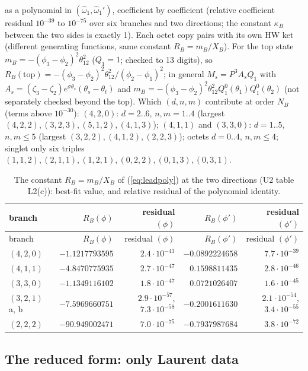 \documentclass[11pt]{article}
\begin{document}
as a polynomial in $(\hat\omega_1,\hat\omega_1')$, coefficient by coefficient (relative coefficient residual $10^{-39}$ to $10^{-75}$ over six branches and two directions; the constant $\kappa_B$ between the two sides is exactly 1).
Each octet copy pairs with its own HW ket (different generating functions, same constant $R_B=m_B/X_B$).
For the top state $m_B=-(\phi_3-\phi_2)^2\theta_{12}^2$ ($Q_1=1$; checked to 13 digits), so $R_B(\mathrm{top})=-(\phi_3-\phi_2)^2\theta_{12}^2/(\phi_2-\phi_1)^2$; in general $M_s=P^3A_sQ_1$ with $A_s=(\zeta_3-\zeta_2)e^{\sigma\theta_s}(\theta_s-\theta_t)$ and $m_B=-(\phi_3-\phi_2)^2\theta_{12}^2Q_1^0(\theta_1)Q_1^0(\theta_2)$ (not separately checked beyond the top).
Which $(d,n,m)$ contribute at order $N_B$ (terms above $10^{-30}$): $(4,2,0)$: $d=2..6$, $n,m=1..4$ (largest $(4,2,2),(3,2,3),(5,1,2),(4,1,3)$); $(4,1,1)$ and $(3,3,0)$: $d=1..5$, $n,m\le5$ (largest $(3,2,2),(4,1,2),(2,2,3)$); octets $d=0..4$, $n,m\le4$; singlet only six triples $(1,1,2),(2,1,1),(1,2,1),(0,2,2),(0,1,3),(0,3,1)$.

{\small
\begin{longtable}{lrrrr}
\caption{The constant $R_B=m_B/X_B$ of (\ref{eq:leadpoly}) at the two directions (U2 table L2(c)): best-fit value, and relative residual of the polynomial identity.}\label{tab:RB}\\
\toprule
branch & $R_B(\phi)$ & residual $(\phi)$ & $R_B(\phi')$ & residual $(\phi')$ \\
\midrule
\endfirsthead
\toprule
branch & $R_B(\phi)$ & residual $(\phi)$ & $R_B(\phi')$ & residual $(\phi')$ \\
\midrule
\endhead
\bottomrule
\endlastfoot
$(4,2,0)$ & $-1.1217793595$ & $2.4\cdot10^{-43}$ & $-0.0892224658$ & $7.7\cdot10^{-39}$ \\
$(4,1,1)$ & $-4.8470775935$ & $2.7\cdot10^{-47}$ & $0.1598811435$ & $2.8\cdot10^{-46}$ \\
$(3,3,0)$ & $-1.1349116102$ & $1.8\cdot10^{-47}$ & $0.0721026407$ & $1.6\cdot10^{-45}$ \\
$(3,2,1)$ a, b & $-7.5969660751$ & $2.9\cdot10^{-57}$, $7.3\cdot10^{-58}$ & $-0.2001611630$ & $2.1\cdot10^{-54}$, $3.4\cdot10^{-55}$ \\
$(2,2,2)$ & $-90.949002471$ & $7.0\cdot10^{-75}$ & $-0.7937987684$ & $3.8\cdot10^{-72}$ \\
\end{longtable}}


\subsection{The reduced form: only Laurent data}\label{sec:redform}
\end{document}
